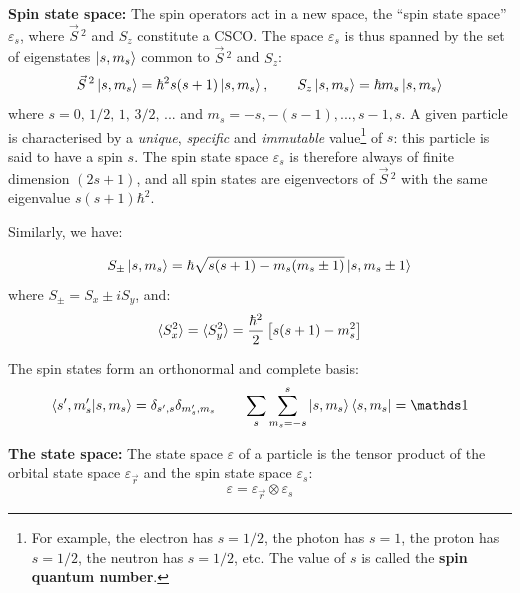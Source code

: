 \begin{postulate}
    \textbf{Spin state space:} The spin operators act in a new space, the ``spin state space'' $\varepsilon_s$, where $\vec{S}\,^2$ and $S_z$ constitute a CSCO. The space $\varepsilon_s$ is thus spanned by the set of eigenstates $\ket{s,m_s}$ common to $\vec{S}\,^2$ and $S_z$:
    \begin{equation} \label{eigenstates_of_S2_and_Sz}
        \vec{S}\,^2 \ket{s, m_s} = \hbar^2s(s+1)\ket{s, m_s}, \qquad S_z \ket{s, m_s} = \hbar m_s\ket{s, m_s}
    \end{equation}
    where $s = 0,\, 1/2,\, 1,\, 3/2,\, ...$ and $m_s = -s, -(s-1), ..., s-1, s$. A given particle is characterised by a \textit{unique}, \textit{specific} and \textit{immutable} value\footnote{For example, the electron has $s = 1/2$, the photon has $s = 1$, the proton has $s = 1/2$, the neutron has $s = 1/2$, etc. The value of $s$ is called the \textbf{spin quantum number}.} of $s$: this particle is said to have a spin $s$. The spin state space $\varepsilon_s$ is therefore always of finite dimension $(2s + 1)$, and all spin states are eigenvectors of $\vec{S}\,^2$ with the same eigenvalue $s(s + 1)\hbar^2$.
    
    Similarly, we have:

    \begin{equation} \label{eq:spin_pm_ops}
        S_\pm \ket{s, m_s} = \hbar \sqrt{s(s+1)-m_s(m_s\pm 1)}\ket{s, m_s\pm 1}
    \end{equation}
    where $S_\pm = S_x \pm iS_y$, and:
    \begin{equation}
        \braket{S_x^2} = \braket{S_y^2} = \frac{\hbar^2}{2}\left[s(s+1) - m_s^2\right]
    \end{equation}

    The spin states form an orthonormal and complete basis:
    \begin{equation}
        \braket{s', m_s'|s, m_s} = \delta_{s',s}\delta_{m_s',m_s} \qquad \sum_s\sum_{m_s=-s}^{s}\ket{s,m_s}\bra{s,m_s} = \Imat
    \end{equation}
\end{postulate}

\begin{postulate} \label{postulate:tensor_product}
    \textbf{The state space:} The state space $\varepsilon$ of a particle is the tensor product of the orbital state space $\varepsilon_{\vec{r}}$ and the spin state space $\varepsilon_s$:
    \begin{equation}
        \varepsilon = \varepsilon_{\vec{r}} \otimes \varepsilon_s
    \end{equation}
\end{postulate}

